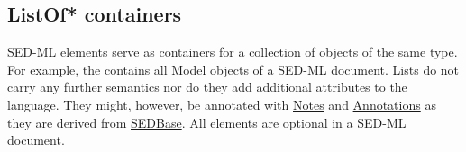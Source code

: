 \subsection{ListOf* containers}
\label{listOfElements}
SED-ML  elements serve as containers  for a collection of objects of the same type. For example, the  contains all \hyperref[class:model]{Model} objects of a SED-ML document. Lists do not carry any further semantics nor do they add additional attributes to the language. They might, however, be annotated with \hyperref[class:notes]{Notes} and \hyperref[class:annotation]{Annotations} as they are derived from \hyperref[class:sedBase]{SEDBase}.
All  elements are optional in a SED-ML document. 

  

  

  

  

  

  
  
  

 

 


